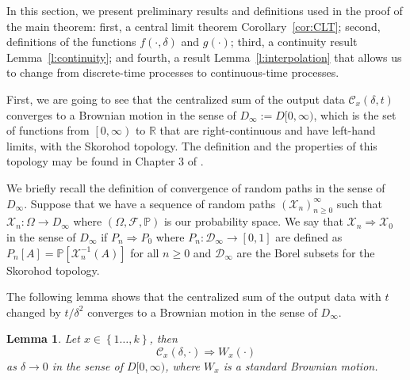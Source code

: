 \documentclass{wscpaperproc}
\theoremstyle{wsc}
\newtheorem{lemma}{Lemma}
\begin{document}
In this section, we present preliminary results and definitions used in the proof of the main theorem: first, a central limit theorem Corollary~\ref{cor:CLT}; second, definitions of the functions $f(\cdot,\delta)$ and $g(\cdot)$; third, a continuity result Lemma~\ref{l:continuity}; and fourth, a result Lemma~\ref{l:interpolation} that allows us to change from discrete-time processes to continuous-time processes.

First, we are going to see that the centralized sum of the output
data $\mathcal{C}_x(\delta,t)$ converges to a Brownian motion in the sense of $D_{\infty}:=D[0,\infty)$,
which is the set of functions from $\left[0,\infty\right)$ to $\mathbb{R}$
that are right-continuous and have left-hand limits, with the Skorohod
topology. The definition and the properties of this topology may be
found in Chapter 3 of . 

We briefly recall the definition of convergence of random paths in
the sense of $D_{\infty}$. Suppose that we have a sequence of random
paths $\left(\mathcal{X}_{n}\right)_{n\geq0}^{\infty}$ such that
$\mathcal{X}_{n}:\varOmega\rightarrow D_{\infty}$ where $\left(\Omega,\mathcal{F},\mathbb{P}\right)$
is our probability space. We say that $\mathcal{X}_{n}\Rightarrow\mathcal{X}_{0}$
in the sense of $D_{\infty}$ if $P_{n}\Rightarrow P_{0}$ where $P_{n}:\mathcal{D}_{\infty}\rightarrow\left[0,1\right]$
are defined as $P_{n}\left[A\right]=\mathbb{P}\left[\mathcal{X}_{n}^{-1}\left(A\right)\right]$
for all $n\geq0$ and $\mathcal{D}_{\infty}$ are the Borel subsets
for the Skorohod topology.

The following lemma shows that the centralized sum of the output
data with $t$ changed by $t/\delta^{2}$ converges to a Brownian
motion in the sense of $D_{\infty}$. 

\begin{lemma}
Let $x\in\left\{ 1\ldots,k\right\} $, then
\[
\mathcal{C}_{x}\left(\delta,\cdot\right)\Rightarrow W_{x}\left(\cdot\right)
\]
as $\delta\rightarrow0$ in the sense of $D[0,\infty)$, where $W_{x}$
is a standard Brownian motion.
\end{lemma}
\end{document}

